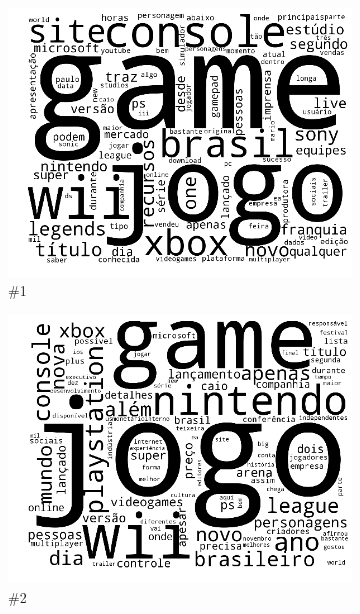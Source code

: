 \documentclass[
    12pt,                %
    oneside,            %
    a4paper,            %
    english,            %
    brazil                %
    ]{abntex2ppgsi}
\begin{document}
\begin{figure}[H]
\centering
    \begin{subfigure}[b]{0.15\textwidth}
        \includegraphics[width=\textwidth]{img/ovnmtf-nc-1-tc-1.png}
        \caption{\#1}
    \end{subfigure}
    \begin{subfigure}[b]{0.15\textwidth}
        \includegraphics[width=\textwidth]{img/ovnmtf-nc-1-tc-2.png}
        \caption{\#2}
    \end{subfigure}
    \begin{subfigure}[b]{0.15\textwidth}

\end{subfigure}
\end{figure}
\end{document}
